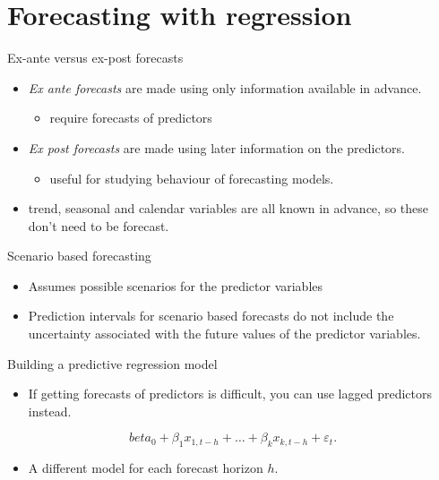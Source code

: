 \documentclass[
  14pt,
  ignorenonframetext,
  aspectratio=169,
]{beamer}
\providecommand{\tightlist}{%
  \setlength{\itemsep}{0pt}\setlength{\parskip}{0pt}}
\begin{document}
\section{Forecasting with regression}\label{forecasting-with-regression}

\begin{frame}{Ex-ante versus ex-post forecasts}
\protect{}\label{ex-ante-versus-ex-post-forecasts}
\begin{itemize}
\tightlist
\item
  \emph{Ex ante forecasts} are made using only information available in
  advance.

  \begin{itemize}
  \tightlist
  \item
    require forecasts of predictors
  \end{itemize}
\item
  \emph{Ex post forecasts} are made using later information on the
  predictors.

  \begin{itemize}
  \tightlist
  \item
    useful for studying behaviour of forecasting models.
  \end{itemize}
\item
  trend, seasonal and calendar variables are all known in advance, so
  these don't need to be forecast.
\end{itemize}
\end{frame}

\begin{frame}{Scenario based forecasting}
\protect{}\label{scenario-based-forecasting}
\begin{itemize}
\tightlist
\item
  Assumes possible scenarios for the predictor variables
\item
  Prediction intervals for scenario based forecasts do not include the
  uncertainty associated with the future values of the predictor
  variables.
\end{itemize}
\end{frame}

\begin{frame}{Building a predictive regression model}
\protect{}\label{building-a-predictive-regression-model}
\begin{itemize}
\tightlist
\item
  If getting forecasts of predictors is difficult, you can use lagged
  predictors instead.
\end{itemize}

\begin{block}{}\vspace*{-0.3cm}
$$
  beta_0+\beta_1x_{1,t-h}+\dots+\beta_kx_{k,t-h}+\varepsilon_{t}.
$$
\end{block}

\begin{itemize}
\tightlist
\item
  A different model for each forecast horizon \(h\).
\end{itemize}
\end{frame}
\end{document}
